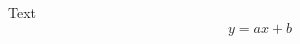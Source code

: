 \documentclass[a4paper,10pt,fleqn]{article}
\begin{document}
  \noindent Text
  \begin{equation*}
  y = ax + b
  \end{equation*}
\end{document}
